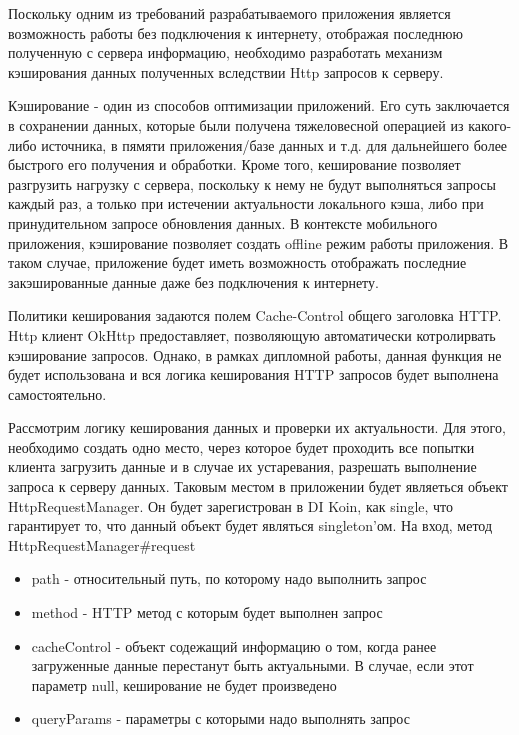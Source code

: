 Поскольку одним из требований разрабатываемого приложения является возможность работы без подключения к интернету, отображая последнюю полученную с сервера информацию, необходимо разработать механизм кэширования данных полученных вследствии Http запросов к серверу.

Кэширование - один из способов оптимизации приложений.
Его суть заключается в сохранении данных, которые были получена тяжеловесной операцией из какого-либо источника, в пямяти приложения/базе данных и т.д. для дальнейшего более быстрого его получения и обработки.
Кроме того, кеширование позволяет разгрузить нагрузку с сервера, поскольку к нему не будут выполняться запросы каждый раз, а только при истечении актуальности локального кэша, либо при принудительном запросе обновления данных.
В контексте мобильного приложения, кэширование позволяет создать offline режим работы приложения.
В таком случае, приложение будет иметь возможность отображать последние закэшированные данные даже без подключения к интернету.

Политики кеширования задаются полем Cache-Control общего заголовка HTTP. Http клиент OkHttp предоставляет, позволяющую автоматически котролирвать кэширование запросов.
Однако, в рамках дипломной работы, данная функция не будет использована и вся логика кеширования HTTP запросов будет выполнена самостоятельно.

Рассмотрим логику кеширования данных и проверки их актуальности.
Для этого, необходимо создать одно место, через которое будет проходить все попытки клиента загрузить данные и в случае их устаревания, разрешать выполнение запроса к серверу данных.
Таковым местом в приложении будет являеться объект HttpRequestManager.
Он будет зарегистрован в DI Koin, как single, что гарантирует то, что данный объект будет являться singleton'ом.
На вход, метод HttpRequestManager\#request
\begin{itemize}
    \item path - относительный путь, по которому надо выполнить запрос
    \item method - HTTP метод с которым будет выполнен запрос
    \item cacheControl - объект содежащий информацию о том, когда ранее загруженные данные перестанут быть актуальными.
    В случае, если этот параметр null, кеширование не будет произведено
    \item queryParams - параметры с которыми надо выполнять запрос
\end{itemize}

